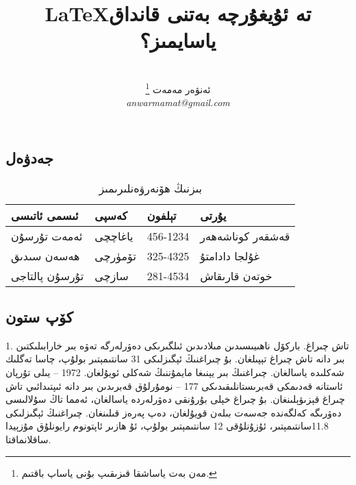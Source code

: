 \documentclass[24]{article}
\begin{document}
\begin{titlepage}
\title{\textarabic{\LaTeX  تە ئۇيغۇرچە بەتنى قانداق ياسايمىز؟ }}
\author{
{\em } \\\textarabic{ئەنۋەر مەمەت \footnote{\textarabic{مەن بەت ياساشقا قىزىقىپ بۇنى ياساپ باقتىم.}}}\\
{\em anwarmamat@gmail.com}\\
}
\date{}
\maketitle{}
\thispagestyle{empty}


\begin{Arabic}
\renewfontfamily{}
\section{\textarabic{ جەدۋەل }}
\end{Arabic}
\renewfontfamily{}

\begin {table}[h]
\caption {\textarabic{بىزنىڭ ھۆنەرۋەنلىرىمىز}} \label{tab:people} 
\begin{center}
\begin{Arabic}
    \begin{tabular}{ | l | l | l | l |}
    \hline
   {ئىسمى ئاتىسى} & كەسپى & تېلفون &  يۇرتى{}  \\ \hline
    ئەمەت تۇرسۇن & ياغاچچى & 456-1234 & قەشقەر كوناشەھەر \\ \hline
    ھەسەن سىدىق & تۆمۈرچى & 325-4325 & غۇلجا دادامتۇ \\ \hline
    تۇرسۇن پالتاجى & سازچى & 281-4534 & خوتەن قارىقاش\\
    \hline
    
    \end{tabular}
    \end{Arabic}
\end{center}
\end{table}

\begin{Arabic}
\section{\textarabic{كۆپ ستون }}
\RTLmulticolcolumns
\begin{multicols}{3}
1. تاش چىراغ. باركۆل ناھىيىسىدىن مىلادىدىن ئىلگىرىكى دەۋرلەرگە تەۋە بىر خارابىلىكتىن بىر دانە تاش چىراغ تېپىلغان. بۇ چىراغنىڭ ئېگىزلىكى 31 سانتىمېتىر بولۇپ، چاسا تەگلىك شەكلىدە ياسالغان. چىراغنىڭ بىر يېنىغا مايمۇننىڭ شەكلى ئويۇلغان. 1972 – يىلى تۇرپان ئاستانە قەدىمكى قەبرىستانلىقىدىكى 177 – نومۇرلۇق قەبرىدىن بىر دانە ئىپتىدائىي تاش چىراغ قېزىۋېلىنغان. بۇ چىراغ خېلى بۇرۇنقى دەۋرلەردە ياسالغان، ئەمما تاڭ سۇلالىسى دەۋرىگە كەلگەندە جەسەت بىلەن قويۇلغان، دەپ پەرەز قىلىنغان. چىراغنىڭ ئېگىزلىكى 11.8سانتىمېتىر، ئۇزۇنلۇقى 12 سانتىمېتىر بولۇپ، ئۇ ھازىر ئاپتونوم رايونلۇق مۇزېيدا ساقلانماقتا.


\end{multicols}
\end{Arabic}
\end{titlepage}
\end{document}

